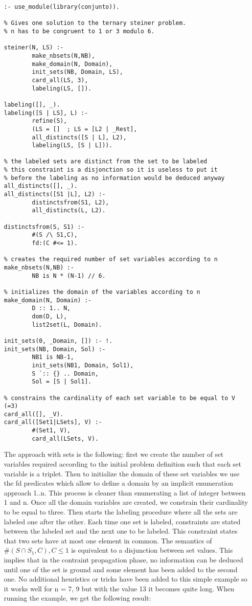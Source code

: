 \begin{verbatim}
:- use_module(library(conjunto)).

% Gives one solution to the ternary steiner problem.
% n has to be congruent to 1 or 3 modulo 6.

steiner(N, LS) :-
        make_nbsets(N,NB),
        make_domain(N, Domain),
        init_sets(NB, Domain, LS),
        card_all(LS, 3),
        labeling(LS, []).

labeling([], _).
labeling([S | LS], L) :-
        refine(S),
        (LS = []  ; LS = [L2 | _Rest],
        all_distincts([S | L], L2),
        labeling(LS, [S | L])).

% the labeled sets are distinct from the set to be labeled
% this constraint is a disjonction so it is useless to put it
% before the labeling as no information would be deduced anyway
all_distincts([], _).
all_distincts([S1 |L], L2) :-
        distinctsfrom(S1, L2),
        all_distincts(L, L2).

distinctsfrom(S, S1) :-
        #(S /\ S1,C),
        fd:(C #<= 1).

% creates the required number of set variables according to n
make_nbsets(N,NB) :-
        NB is N * (N-1) // 6.

% initializes the domain of the variables according to n
make_domain(N, Domain) :-
        D :: 1.. N,
        dom(D, L),
        list2set(L, Domain).

init_sets(0, _Domain, []) :- !.
init_sets(NB, Domain, Sol) :-
        NB1 is NB-1,
        init_sets(NB1, Domain, Sol1),
        S `:: {} .. Domain,
        Sol = [S | Sol1].

% constrains the cardinality of each set variable to be equal to V (=3)
card_all([], _V).
card_all([Set1|LSets], V) :-
        #(Set1, V),
        card_all(LSets, V).
\end{verbatim}

The approach with sets is the following: first we create the number of
set variables required according to the initial problem definition
such that each set variable is a triplet. Then to initialize the
domain of these set variables we use the fd predicates which allow to
define a domain by an implicit enumeration approach 1..n. This process
is cleaner than enumerating a list of integer between 1 and n. Once
all the domain variables are created, we constrain their cardinality
to be equal to three. Then starts the labeling procedure where all the
sets are labeled one after the other. Each time one set is labeled,
constraints are stated between the labeled set and the next one to be
labeled. This constraint states that two sets have at most one element
in common. The semantics of
$\#(S \cap S_1 ,C), C \leq 1$
is equivalent
to a disjunction between set values. This implies that in the
contraint propagation phase, no information can be deduced until one
of the set is ground and some element has been added to the second
one. No additional heuristics or tricks have been added to this simple
example so it works well for n = 7, 9 but with the value 13 it becomes
quite long.  When running the example, we get the following result:

